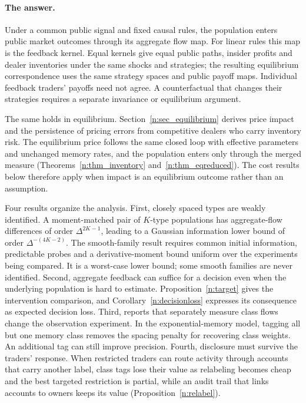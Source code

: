 \documentclass[12pt]{article}
\theoremstyle{definition}
\theoremstyle{remark}
\begin{document}
\paragraph{The answer.} Under a common public signal and fixed causal rules, the population enters public market outcomes through its aggregate flow map. For linear rules this map is the feedback kernel. Equal kernels give equal public paths, insider profits and dealer inventories under the same shocks and strategies; the resulting equilibrium correspondence uses the same strategy spaces and public payoff maps. Individual feedback traders' payoffs need not agree. A counterfactual that changes their strategies requires a separate invariance or equilibrium argument.

The same holds in equilibrium. Section~\ref{n:sec_equilibrium} derives price impact and the persistence of pricing errors from competitive dealers who carry inventory risk. The equilibrium price follows the same closed loop with effective parameters and unchanged memory rates, and the population enters only through the merged measure (Theorems~\ref{n:thm_inventory} and~\ref{n:thm_eqreduced}). The cost results below therefore apply when impact is an equilibrium outcome rather than an assumption.

    Four results organize the analysis. First, closely spaced types are weakly identified. A moment-matched pair of $K$-type populations has aggregate-flow differences of order $\Delta^{2K-1}$, leading to a Gaussian information lower bound of order $\Delta^{-(4K-2)}$. The smooth-family result requires common initial information, predictable probes and a derivative-moment bound uniform over the experiments being compared. It is a worst-case lower bound; some smooth families are never identified. Second, aggregate feedback can suffice for a decision even when the underlying population is hard to estimate. Proposition~\ref{n:target} gives the intervention comparison, and Corollary~\ref{n:decisionloss} expresses its consequence as expected decision loss. Third, reports that separately measure class flows change the observation experiment. In the exponential-memory model, tagging all but one memory class removes the spacing penalty for recovering class weights. An additional tag can still improve precision. Fourth, disclosure must survive the traders' response. When restricted traders can route activity through accounts that carry another label, class tags lose their value as relabeling becomes cheap and the best targeted restriction is partial, while an audit trail that links accounts to owners keeps its value (Proposition~\ref{n:relabel}).
\end{document}
